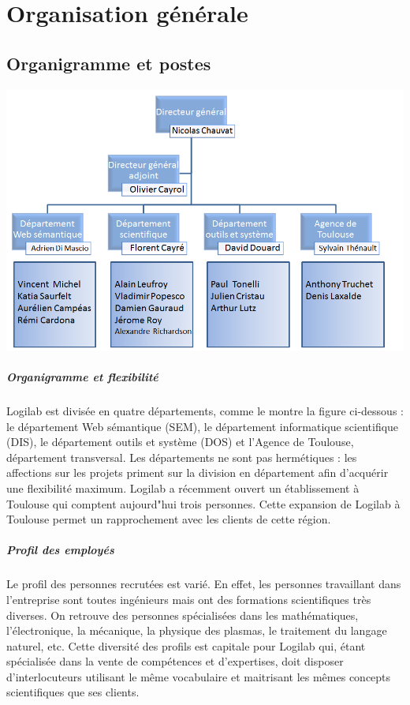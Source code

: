 \documentclass {report}
\begin{document}
\chapter{Organisation générale}

\section{Organigramme et postes}

\begin{center}
\includegraphics[scale=0.7]{organigramme.png}
\end{center}



\paragraph{Organigramme et flexibilité}
Logilab est divisée en quatre départements, comme le montre la figure ci-dessous : le département Web sémantique (SEM), le département informatique scientifique (DIS), le département outils et système (DOS) et l'Agence de Toulouse, département transversal. Les départements ne sont pas hermétiques : les affections sur les projets priment sur la division en département afin d'acquérir une flexibilité maximum. Logilab a récemment ouvert un établissement à Toulouse qui comptent aujourd"hui trois personnes. Cette expansion de Logilab à Toulouse permet un rapprochement avec les clients de cette région.

\paragraph{Profil des employés}
Le profil des personnes recrutées est varié. En effet, les personnes travaillant dans l’entreprise sont toutes ingénieurs mais ont des formations scientifiques très diverses. On retrouve des personnes spécialisées dans les mathématiques, l’électronique, la mécanique, la physique des plasmas, le traitement du langage naturel, etc. Cette diversité des profils est capitale pour Logilab qui, étant spécialisée dans la vente de compétences et d’expertises, doit disposer d’interlocuteurs utilisant le même vocabulaire et maitrisant les mêmes concepts scientifiques que ses clients. 
\end{document}
